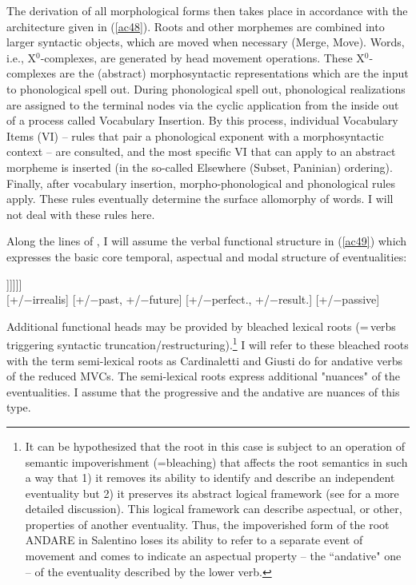 \documentclass[output=paper]{langscibook}
\begin{document}
The derivation of all morphological forms then takes place in accordance with the architecture given in (\ref{ac48}). Roots and other morphemes are combined into larger syntactic objects, which are moved when necessary (Merge, Move). Words, i.e., X$^0$-complexes, are generated by head movement operations. These X$^0$-complexes are the (abstract) morphosyntactic representations which are the input to phonological spell out.  During phonological spell out, phonological realizations are assigned to the terminal nodes via the cyclic application from the inside out of a process called Vocabulary Insertion. By this process, individual Vocabulary Items (VI)  --  rules that pair a phonological exponent with a morphosyntactic context -- are consulted, and the most specific VI that can apply to an abstract morpheme is inserted (in the so-called Elsewhere (Subset, Paninian) ordering).  Finally, after vocabulary insertion, morpho-phonological and phonological rules apply.  These rules eventually determine the surface allomorphy of words.  I will not deal with these rules here.

Along the lines of \citet{wurmbrand2015}, I will assume the verbal functional structure in (\ref{ac49}) which expresses the basic core temporal, aspectual and modal structure of eventualities:

\ea \label{ac49}
\gll [\textsubscript{MoodP} Mood$^0$ [\textsubscript{TenseP} T$^0$ [\textsubscript{AspP} Asp$^0$ [\textsubscript{VoiceP} Voice$^0$ [\textsubscript{vP} v$^0$ [\textsubscript{√p} √Root$^0$ ]]]]]]\\
     {} [+/−irrealis] {} {[+/−past, +/−future]} {}  {[+/−perfect., +/−result.]} {} [+/−passive] {} {} {} {} {}\\
\z

Additional functional heads may be provided by bleached lexical roots (=\,verbs triggering syntactic truncation\slash restructuring).\footnote{It can be hypothesized that the root in this case is subject to an operation of semantic impoverishment (=bleaching) that affects the root semantics in such a way that 1) it removes its ability to identify and describe an independent eventuality but 2) it preserves its abstract logical framework (see \cite{roberts2010a} for a more detailed discussion).  This logical framework can describe aspectual, or other, properties of another eventuality.  Thus, the impoverished form of the root ANDARE in Salentino loses its ability to refer to a separate event of movement and comes to indicate an aspectual property -- the “andative" one -- of the eventuality described by the lower verb.}  I will refer to these bleached roots with the term semi-lexical roots as Cardinaletti and Giusti do for andative verbs of the reduced MVCs. The semi-lexical roots express additional "nuances" of the eventualities.   I assume that the progressive and the andative are nuances of this type.
\end{document}
